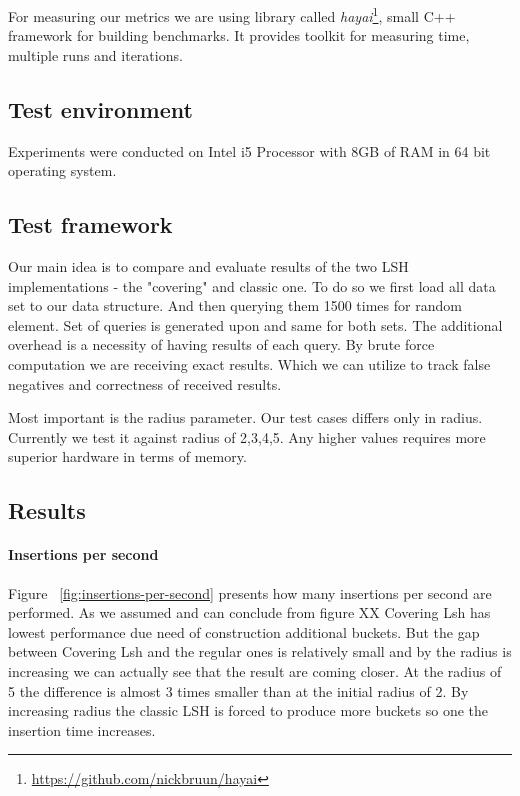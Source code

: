 For measuring our metrics we are using library called \textit{hayai}\footnote{\url{https://github.com/nickbruun/hayai}}, small C++ framework for building benchmarks. It provides toolkit for measuring time, multiple runs and iterations.

\subsection{Test environment}

Experiments were conducted on Intel i5 Processor with 8GB of RAM in 64 bit operating system.

\subsection{Test framework}

Our main idea is to compare and evaluate results of the two LSH implementations - the "covering" and classic one. To do so we first load all data set to our data structure. And then querying them 1500 times for random element. Set of queries is generated upon and same for both sets. The additional overhead is a necessity of having results of each query. By brute force computation we are receiving exact results. Which we can utilize to track false negatives and correctness of received results.

Most important is the radius parameter. Our test cases differs only in radius. Currently we test it against radius of 2,3,4,5. Any higher values requires more superior hardware in terms of memory.

\subsection{Results}

\paragraph{Insertions per second}

Figure ~\ref{fig:insertions-per-second} presents how many insertions per second are performed. As we assumed and can conclude from figure XX  Covering Lsh has lowest performance due need of construction additional buckets. But the gap between Covering Lsh and the regular ones is relatively small and by the radius is increasing we can actually see that the result are coming closer. At the radius of 5 the difference is almost 3 times smaller than at the initial radius of 2. By increasing radius the classic LSH is forced to produce more buckets so one the insertion time increases.

